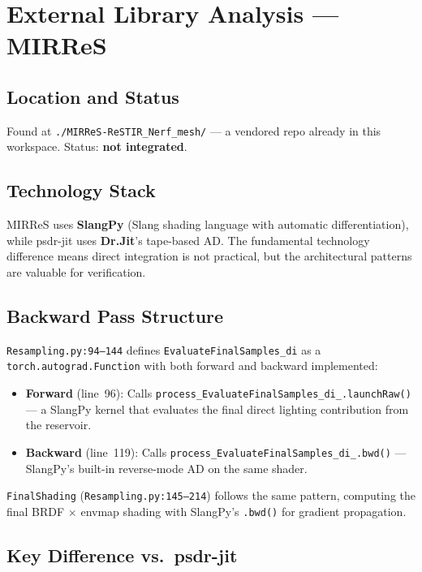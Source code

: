 \section{External Library Analysis --- MIRReS}
\label{sec:mirres}

\subsection{Location and Status}

\noindent Found at \texttt{./MIRReS-ReSTIR\_Nerf\_mesh/} --- a vendored repo
already in this workspace. Status: \textbf{not integrated}.

\subsection{Technology Stack}

MIRReS uses \textbf{SlangPy} (Slang shading language with automatic
differentiation), while psdr-jit uses \textbf{Dr.Jit}'s tape-based AD. The
fundamental technology difference means direct integration is not practical,
but the architectural patterns are valuable for verification.

\subsection{Backward Pass Structure}

\texttt{Resampling.py:94--144} defines \texttt{EvaluateFinalSamples\_di} as a
\texttt{torch.autograd.Function} with both forward and backward implemented:

\begin{itemize}
    \item \textbf{Forward} (line~96): Calls
        \texttt{process\_EvaluateFinalSamples\_di\_.launchRaw()} --- a
        SlangPy kernel that evaluates the final direct lighting contribution
        from the reservoir.
    \item \textbf{Backward} (line~119): Calls
        \texttt{process\_EvaluateFinalSamples\_di\_.bwd()} --- SlangPy's
        built-in reverse-mode AD on the same shader.
\end{itemize}

\texttt{FinalShading} (\texttt{Resampling.py:145--214}) follows the same
pattern, computing the final BRDF $\times$ envmap shading with SlangPy's
\texttt{.bwd()} for gradient propagation.

\subsection{Key Difference vs.\ psdr-jit}

